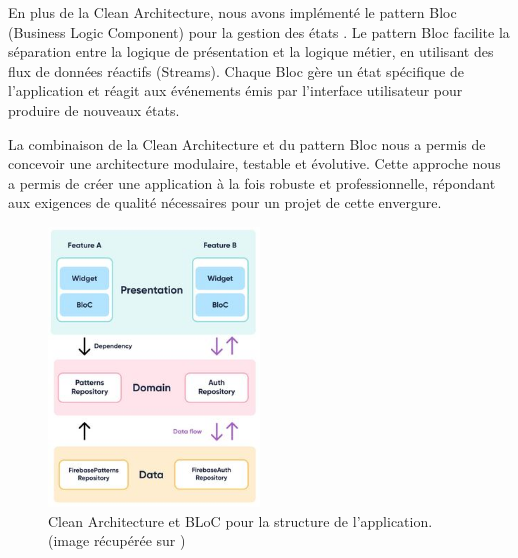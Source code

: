 En plus de la Clean Architecture, nous avons implémenté le pattern Bloc (Business Logic Component) pour la gestion des états \cite{blocPattern}. Le pattern Bloc facilite la séparation entre la logique de présentation et la logique métier, en utilisant des flux de données réactifs (Streams). Chaque Bloc gère un état spécifique de l'application et réagit aux événements émis par l'interface utilisateur pour produire de nouveaux états.

La combinaison de la Clean Architecture et du pattern Bloc nous a permis de concevoir une architecture modulaire, testable et évolutive. Cette approche nous a permis de créer une application à la fois robuste et professionnelle, répondant aux exigences de qualité nécessaires pour un projet de cette envergure.


\begin{figure}[H]
    \centering
    \includegraphics[width=0.5\textwidth]{images/firebase-architecture-BLoC.jpeg}
    \caption{Clean Architecture et BLoC pour la structure de l'application. (image récupérée sur \cite{googleCloudArchitecture})
    }
    \label{fig:architecture}
\end{figure}


